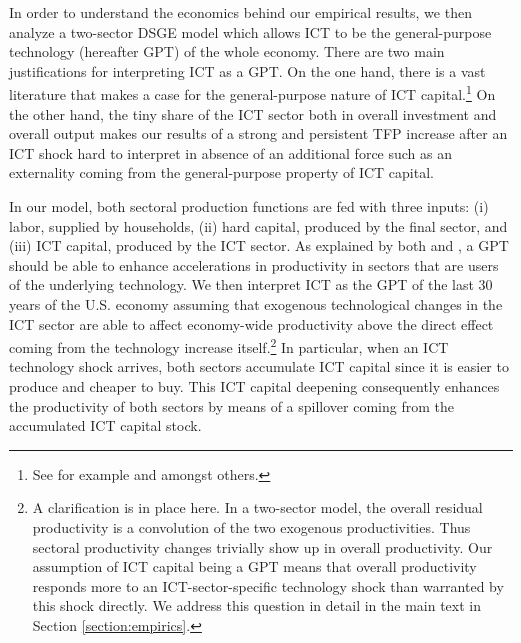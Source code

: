 \documentclass[12pt]{article}
\begin{document}
In order to understand the economics behind our empirical results, we then analyze a two-sector DSGE model which allows ICT to be the general-purpose technology (hereafter GPT) of the whole economy. There are two main justifications for interpreting ICT as a GPT. On the one hand, there is a vast literature that makes a case for the general-purpose nature of ICT capital.\footnote{See for example \cite{oliner2000resurgence} and \cite{stiroh2002information} amongst others.} On the other hand, the tiny share of the ICT sector both in overall investment and overall output makes our results of a strong and persistent TFP increase after an ICT shock hard to interpret in absence of an additional force such as an externality coming from the general-purpose property of ICT capital.

In our model, both sectoral production functions are fed with three inputs: (i) labor, supplied by households, (ii) hard capital, produced by the final sector, and (iii) ICT capital, produced by the ICT sector. As explained by both \cite{basu2003case} and \cite{basu2007information}, a GPT should be able to enhance accelerations in productivity in sectors that are users of the underlying technology. We then interpret ICT as the GPT of the last 30 years of the U.S. economy assuming that exogenous technological changes in the ICT sector are able to affect economy-wide productivity above the direct effect coming from the technology increase itself.\footnote{A clarification is in place here. In a two-sector model, the overall residual productivity is a convolution of the two exogenous productivities. Thus sectoral productivity changes trivially show up in overall productivity. Our assumption of ICT capital being a GPT means that overall productivity responds more to an ICT-sector-specific technology shock than warranted by this shock directly. We address this question in detail in the main text in Section \ref{section:empirics}.} In particular, when an ICT technology shock arrives, both sectors accumulate ICT capital since it is easier to produce and cheaper to buy. This ICT capital deepening consequently enhances the productivity of both sectors by means of a spillover coming from the accumulated ICT capital stock. 
\end{document}
